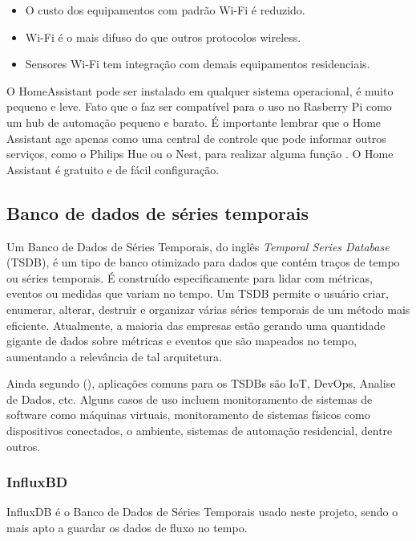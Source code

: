 \begin{itemize}
	\item O custo dos equipamentos com padrão Wi-Fi é reduzido.
	\item Wi-Fi é o mais difuso do que outros protocolos wireless.
	\item Sensores Wi-Fi tem integração com demais equipamentos residenciais.
\end{itemize}

O HomeAssistant pode ser instalado em qualquer sistema operacional, é muito pequeno e leve. Fato que o faz ser compatível para o uso no Rasberry Pi como um hub de automação pequeno e barato. É importante lembrar que o Home Assistant age apenas como uma central de controle que pode informar outros serviços, como o Philips Hue ou o Nest, para realizar alguma função \cite{AlmeidaCosta}. O Home Assistant é gratuito e de fácil configuração.

\subsection{Banco de dados de séries temporais}

Um Banco de Dados de Séries Temporais, do inglês \textit{Temporal Series Database} (TSDB), é um tipo de banco otimizado para dados que contém traços de tempo ou séries temporais. É construído especificamente para lidar com métricas, eventos ou medidas que variam no tempo. Um TSDB permite o usuário criar, enumerar, alterar, destruir e organizar várias séries temporais de um método mais eficiente. Atualmente, a maioria das empresas estão gerando uma quantidade gigante de dados sobre métricas e eventos que são mapeados no tempo, aumentando a relevância de tal arquitetura.\cite{Noor2017}

Ainda segundo \citeauthor{Noor2017} (\citeyear{Noor2017}), aplicações comuns para os TSDBs são IoT, DevOps, Analise de Dados, etc. Alguns casos de uso incluem monitoramento de sistemas de software como máquinas virtuais, monitoramento de sistemas físicos como dispositivos conectados, o ambiente, sistemas de automação residencial, dentre outros.

\subsubsection{InfluxBD}

InfluxDB é o Banco de Dados de Séries Temporais usado neste projeto, sendo o mais apto a guardar os dados de fluxo no tempo. \cite{Lundrigan2017}


